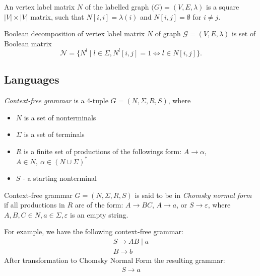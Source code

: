 \begin{definition}

An vertex label matrix $N$ of the labelled graph $\mathcal(G)=(V, E, \lambda)$ is a square $|V|\times|V|$ matrix, such that $N[i,i] = \lambda (i)$ and $N[i,j] = \emptyset$ for $i \neq j$.

\end{definition}

\begin{definition}

Boolean decomposition of vertex label matrix $N$ of graph $\mathcal{G}=(V, E, \lambda)$ is set of Boolean matrix $$\mathcal{N} = \{N^l \mid l \in \Sigma, N^l[i,j]=1 \iff l \in N[i,j]\}.$$

\end{definition}

\subsection{Languages}
\begin{definition}\emph{Context-free grammar} is a 4-tuple $G=(N, \Sigma, R, S)$, where 
\begin{itemize}
    \item $N$ is a set of nonterminals
    \item $\Sigma$ is a set of terminals
    \item $R$ is a finite set of productions of the followings form: $A \to \alpha$, $A \in N,~ \alpha \in (N \cup \Sigma)^*$
    \item $S$ - a starting nonterminal
\end{itemize}
\end{definition}
\begin{definition} Context-free grammar $G = (N, \Sigma, R, S)$ is said to be in \emph{Chomsky normal form} if all productions in $R$ are of the form: $A \rightarrow BC$, $A \rightarrow a$, or $S \rightarrow \varepsilon$, where $A, B, C \in N, a \in \Sigma, \varepsilon$ is an empty string.
\end{definition}

For example, we have the following context-free grammar:
\begin{align*}
S \rightarrow AB \mid a \\
B \rightarrow b 
\end{align*}
After transformation to Chomsky Normal Form the resulting grammar:
\begin{align*}
S \rightarrow a
\end{align*}

